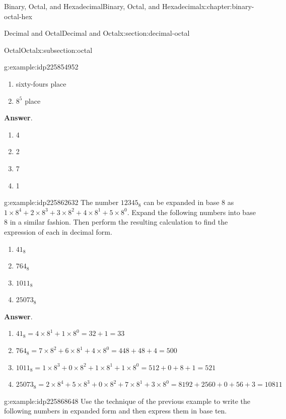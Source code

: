 \documentclass[twoside,10pt,]{book}
\newcommand{\blocktitlefont}{\relax}
\numberwithin{equation}{section}
\begin{document}
\begin{chapterptx}{Binary, Octal, and Hexadecimal}{}{Binary, Octal, and Hexadecimal}{}{}{x:chapter:binary-octal-hex}
\begin{sectionptx}{Decimal and Octal}{}{Decimal and Octal}{}{}{x:section:decimal-octal}
\begin{subsectionptx}{Octal}{}{Octal}{}{}{x:subsection:octal}
\begin{example}{}{g:example:idp225854952}
\begin{enumerate}
\item{}sixty-fours place%
\item{}\(8^5\) place%
\end{enumerate}
%
\par\smallskip%
\noindent\textbf{\blocktitlefont Answer}.\label{g:answer:idp225864936}{}\hypertarget{g:answer:idp225864936}{}\quad{}%
\begin{enumerate}
\item{}4%
\item{}2%
\item{}7%
\item{}1%
\end{enumerate}
%
\end{example}
\begin{example}{}{g:example:idp225862632}%
The number \(12345_8\) can be expanded in base 8 as \(1\times 8^4+2\times 8^3+3\times 8^2+4\times 8^1+5\times 8^0\).  Expand the following numbers into base 8 in a similar fashion.  Then perform the resulting calculation to find the expression of each in decimal form.%
\begin{enumerate}
\item{}\(\displaystyle 41_8\)%
\item{}\(\displaystyle 764_8\)%
\item{}\(\displaystyle 1011_8\)%
\item{}\(\displaystyle 25073_8\)%
\end{enumerate}
%
\par\smallskip%
\noindent\textbf{\blocktitlefont Answer}.\label{g:answer:idp225866984}{}\hypertarget{g:answer:idp225866984}{}\quad{}%
\begin{enumerate}
\item{}\(\displaystyle 41_8=4\times 8^1+1\times 8^0=32+1=33\)%
\item{}\(\displaystyle 764_8=7\times 8^2+6\times 8^1+4\times 8^0=448+48+4=500\)%
\item{}\(\displaystyle 1011_8=1\times 8^3+0\times 8^2+1\times 8^1+1\times 8^0=512+0+8+1=521\)%
\item{}\(\displaystyle 25073_8=2\times 8^4+5\times 8^3+0\times 8^2+7\times 8^1+3\times 8^0=8192+2560+0+56+3=10811\)%
\end{enumerate}
%
\end{example}
\begin{example}{}{g:example:idp225868648}%
Use the technique of the previous example to write the following numbers in expanded form and then express them in base ten.%
\begin{enumerate}

\end{enumerate}
\end{example}
\end{subsectionptx}
\end{sectionptx}
\end{chapterptx}
\end{document}
